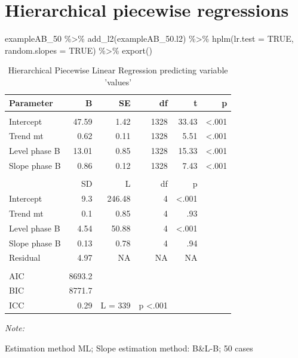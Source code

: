 \documentclass[
]{book}
\newenvironment{Shaded}{\begin{snugshade}}{\end{snugshade}}
\newcommand{\AttributeTok}[1]{\textcolor[rgb]{0.77,0.63,0.00}{#1}}
\newcommand{\ConstantTok}[1]{\textcolor[rgb]{0.00,0.00,0.00}{#1}}
\newcommand{\FunctionTok}[1]{\textcolor[rgb]{0.00,0.00,0.00}{#1}}
\newcommand{\NormalTok}[1]{#1}
\newcommand{\SpecialCharTok}[1]{\textcolor[rgb]{0.00,0.00,0.00}{#1}}
\begin{document}
\hypertarget{hierarchical-piecewise-regressions}{%
\section{Hierarchical piecewise regressions}\label{hierarchical-piecewise-regressions}}

\begin{Shaded}
\begin{Highlighting}[]
\NormalTok{exampleAB\_50 }\SpecialCharTok{\%\textgreater{}\%}
  \FunctionTok{add\_l2}\NormalTok{(exampleAB\_50.l2) }\SpecialCharTok{\%\textgreater{}\%}
  \FunctionTok{hplm}\NormalTok{(}\AttributeTok{lr.test =} \ConstantTok{TRUE}\NormalTok{, }\AttributeTok{random.slopes =} \ConstantTok{TRUE}\NormalTok{) }\SpecialCharTok{\%\textgreater{}\%}
  \FunctionTok{export}\NormalTok{()}
\end{Highlighting}
\end{Shaded}

\begin{table}[!h]

\caption{\label{tab:unnamed-chunk-88}Hierarchical Piecewise Linear Regression predicting variable 'values'}
\begin{threeparttable}
\begin{tabular}[t]{lrrrrr}
\toprule
Parameter & B & SE & df & t & p\\
\midrule
\addlinespace[0.3em]
\multicolumn{6}{l}{\textbf{Fixed effects}}\\
Intercept & 47.59 & 1.42 & 1328 & 33.43 & <.001\\
Trend mt & 0.62 & 0.11 & 1328 & 5.51 & <.001\\
Level phase B & 13.01 & 0.85 & 1328 & 15.33 & <.001\\
Slope phase B & 0.86 & 0.12 & 1328 & 7.43 & <.001\\
\midrule
\addlinespace[0.3em]
\multicolumn{6}{l}{\textbf{Random effects}}\\
 & SD & L & df & p & \\
Intercept & 9.3 & 246.48 & 4 & <.001 & \\
Trend mt & 0.1 & 0.85 & 4 & .93 & \\
Level phase B & 4.54 & 50.88 & 4 & <.001 & \\
Slope phase B & 0.13 & 0.78 & 4 & .94 & \\
Residual & 4.97 & NA & NA & NA & \\
\midrule
\addlinespace[0.3em]
\multicolumn{6}{l}{\textbf{Model}}\\
AIC & 8693.2 &  &  &  & \\
BIC & 8771.7 &  &  &  & \\
ICC & 0.29 & L = 339 & p <.001 &  & \\
\bottomrule
\end{tabular}
\begin{tablenotes}
\item \textit{Note: } 
\item Estimation method ML; Slope estimation method: B\&L-B; 50 cases
\end{tablenotes}
\end{threeparttable}
\end{table}
\end{document}
